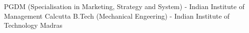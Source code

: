 
% 

\begin{scholarship}
					{PGDM (Specialisation in Marketing, Strategy and System) - Indian Institute of Management Calcutta}
					{B.Tech (Mechanical Engeering) - Indian Institute of Technology Madras}
\end{scholarship}
